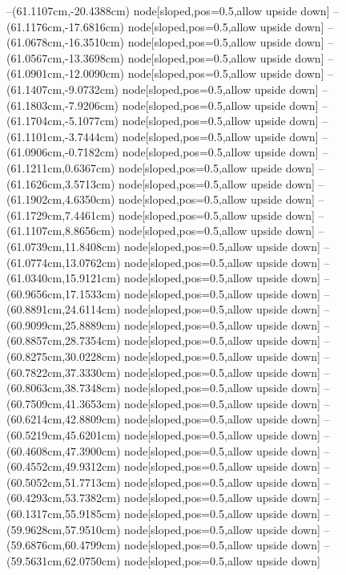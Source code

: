 --(61.1107cm,-20.4388cm) node[sloped,pos=0.5,allow upside down]{\ArrowIn}
--(61.1176cm,-17.6816cm) node[sloped,pos=0.5,allow upside down]{\ArrowIn}
--(61.0678cm,-16.3510cm) node[sloped,pos=0.5,allow upside down]{\ArrowIn}
--(61.0567cm,-13.3698cm) node[sloped,pos=0.5,allow upside down]{\ArrowIn}
--(61.0901cm,-12.0090cm) node[sloped,pos=0.5,allow upside down]{\ArrowIn}
--(61.1407cm,-9.0732cm) node[sloped,pos=0.5,allow upside down]{\ArrowIn}
--(61.1803cm,-7.9206cm) node[sloped,pos=0.5,allow upside down]{\ArrowIn}
--(61.1704cm,-5.1077cm) node[sloped,pos=0.5,allow upside down]{\ArrowIn}
--(61.1101cm,-3.7444cm) node[sloped,pos=0.5,allow upside down]{\ArrowIn}
--(61.0906cm,-0.7182cm) node[sloped,pos=0.5,allow upside down]{\ArrowIn}
--(61.1211cm,0.6367cm) node[sloped,pos=0.5,allow upside down]{\ArrowIn}
--(61.1626cm,3.5713cm) node[sloped,pos=0.5,allow upside down]{\ArrowIn}
--(61.1902cm,4.6350cm) node[sloped,pos=0.5,allow upside down]{\ArrowIn}
--(61.1729cm,7.4461cm) node[sloped,pos=0.5,allow upside down]{\ArrowIn}
--(61.1107cm,8.8656cm) node[sloped,pos=0.5,allow upside down]{\ArrowIn}
--(61.0739cm,11.8408cm) node[sloped,pos=0.5,allow upside down]{\ArrowIn}
--(61.0774cm,13.0762cm) node[sloped,pos=0.5,allow upside down]{\ArrowIn}
--(61.0340cm,15.9121cm) node[sloped,pos=0.5,allow upside down]{\ArrowIn}
--(60.9656cm,17.1533cm) node[sloped,pos=0.5,allow upside down]{\ArrowIn}
--(60.8891cm,24.6114cm) node[sloped,pos=0.5,allow upside down]{\ArrowIn}
--(60.9099cm,25.8889cm) node[sloped,pos=0.5,allow upside down]{\ArrowIn}
--(60.8857cm,28.7354cm) node[sloped,pos=0.5,allow upside down]{\ArrowIn}
--(60.8275cm,30.0228cm) node[sloped,pos=0.5,allow upside down]{\ArrowIn}
--(60.7822cm,37.3330cm) node[sloped,pos=0.5,allow upside down]{\ArrowIn}
--(60.8063cm,38.7348cm) node[sloped,pos=0.5,allow upside down]{\ArrowIn}
--(60.7509cm,41.3653cm) node[sloped,pos=0.5,allow upside down]{\ArrowIn}
--(60.6214cm,42.8809cm) node[sloped,pos=0.5,allow upside down]{\ArrowIn}
--(60.5219cm,45.6201cm) node[sloped,pos=0.5,allow upside down]{\ArrowIn}
--(60.4608cm,47.3900cm) node[sloped,pos=0.5,allow upside down]{\ArrowIn}
--(60.4552cm,49.9312cm) node[sloped,pos=0.5,allow upside down]{\ArrowIn}
--(60.5052cm,51.7713cm) node[sloped,pos=0.5,allow upside down]{\ArrowIn}
--(60.4293cm,53.7382cm) node[sloped,pos=0.5,allow upside down]{\ArrowIn}
--(60.1317cm,55.9185cm) node[sloped,pos=0.5,allow upside down]{\ArrowIn}
--(59.9628cm,57.9510cm) node[sloped,pos=0.5,allow upside down]{\ArrowIn}
--(59.6876cm,60.4799cm) node[sloped,pos=0.5,allow upside down]{\ArrowIn}
--(59.5631cm,62.0750cm) node[sloped,pos=0.5,allow upside down]{\ArrowIn}
